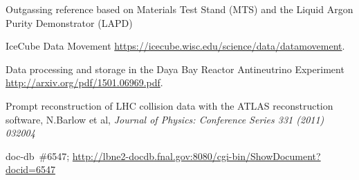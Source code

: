 \begin{thebibliography}{99}



 Outgassing reference based on Materials Test Stand (MTS) and the Liquid Argon Purity Demonstrator (LAPD)

%
%

%
%

%
%

 IceCube Data Movement \url{https://icecube.wisc.edu/science/data/datamovement}.

Data processing and storage in the Daya Bay Reactor Antineutrino Experiment \url{http://arxiv.org/pdf/1501.06969.pdf}.

 Prompt reconstruction of LHC collision data with the ATLAS reconstruction software, N.Barlow et al, \textit{Journal of Physics: Conference Series 331 (2011) 032004}

%
%
 
%
%
 doc-db~\#6547; \url{http://lbne2-docdb.fnal.gov:8080/cgi-bin/ShowDocument?docid=6547}

%
%


\end{thebibliography}
